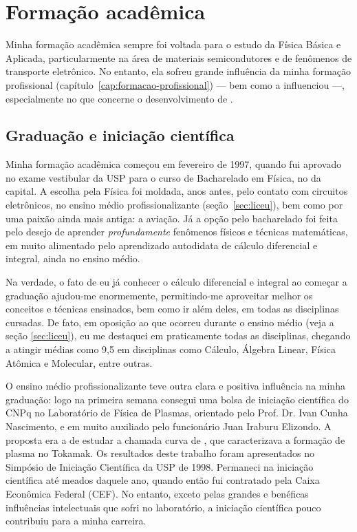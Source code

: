 \chapter{Formação acadêmica}

Minha formação acadêmica sempre foi voltada para o estudo da Física Básica e Aplicada, particularmente na área de materiais semicondutores e de fenômenos de transporte eletrônico. No entanto, ela sofreu grande influência da minha formação profissional (capítulo~\ref{cap:formacao-profissional}) --- bem como a influenciou ---, especialmente no que concerne o desenvolvimento de .

\section{Graduação e iniciação científica}
\label{sec:graduacao}

Minha formação acadêmica começou em fevereiro de 1997, quando fui aprovado no exame vestibular da USP para o curso de Bacharelado em Física, no  da capital. A escolha pela Física foi moldada, anos antes, pelo contato com circuitos eletrônicos, no ensino médio profissionalizante (seção~\ref{sec:liceu}), bem como por uma paixão ainda mais antiga: a aviação. Já a opção pelo bacharelado foi feita pelo desejo de aprender \emph{profundamente} fenômenos físicos e técnicas matemáticas, em muito alimentado pelo aprendizado autodidata de cálculo diferencial e integral, ainda no ensino médio.

Na verdade, o fato de eu já conhecer o cálculo diferencial e integral ao começar a graduação ajudou-me enormemente, permitindo-me aproveitar melhor os conceitos e técnicas ensinados, bem como ir além deles, em todas as disciplinas cursadas. De fato, em oposição ao que ocorreu durante o ensino médio (veja a seção \ref{sec:liceu}), eu me destaquei em praticamente todas as disciplinas, chegando a atingir médias como 9,5 em disciplinas como Cálculo, Álgebra Linear, Física Atômica e Molecular, entre outras.

O ensino médio profissionalizante teve outra clara e positiva influência na minha graduação: logo na primeira semana consegui uma bolsa de iniciação científica do CNPq no Laboratório de Física de Plasmas, orientado pelo Prof. Dr. Ivan Cunha Nascimento, e em muito auxiliado pelo funcionário Juan Iraburu Elizondo. A proposta era a de estudar a chamada curva de , que caracterizava a formação de plasma no Tokamak. Os resultados deste trabalho foram apresentados no Simpósio de Iniciação Científica da USP de 1998. Permaneci na iniciação científica até meados daquele ano, quando então fui contratado pela Caixa Econômica Federal (CEF). No entanto, exceto pelas grandes e benéficas influências intelectuais que sofri no laboratório, a iniciação científica pouco contribuiu para a minha carreira.

